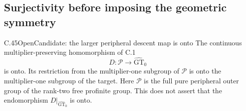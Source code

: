 \subsection{Surjectivity before imposing the geometric symmetry}

\begin{statement}{C.45}{Open}{Candidate: the larger peripheral descent map is onto}
The continuous multiplier-preserving homomorphism of C.1
\[
                    D:\mathcal P\longrightarrow
                       \widehat{\mathrm{GT}}_0
\]
is onto. Its restriction from the multiplier-one subgroup of
$\mathcal P$ is onto the multiplier-one subgroup of the target.
Here $\mathcal P$ is the full pure peripheral outer group of the
rank-two free profinite group. This does not assert that the
endomorphism $D|_{\widehat{\mathrm{GT}}_0}$ is onto.
\end{statement}

